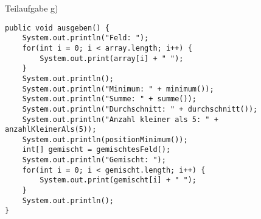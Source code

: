 \documentclass{article}
\begin{document}
Teilaufgabe g) 
\begin{verbatim}
public void ausgeben() {
    System.out.println("Feld: ");
    for(int i = 0; i < array.length; i++) {
        System.out.print(array[i] + " ");
    }
    System.out.println();
    System.out.println("Minimum: " + minimum());
    System.out.println("Summe: " + summe());
    System.out.println("Durchschnitt: " + durchschnitt());
    System.out.println("Anzahl kleiner als 5: " + anzahlKleinerAls(5));
    System.out.println(positionMinimum());
    int[] gemischt = gemischtesFeld();
    System.out.println("Gemischt: ");
    for(int i = 0; i < gemischt.length; i++) {
        System.out.print(gemischt[i] + " ");
    }
    System.out.println();
}
\end{verbatim}
\end{document}
